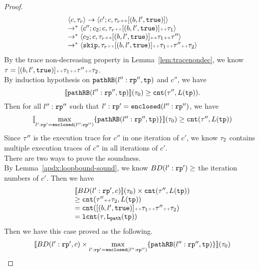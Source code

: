 \begin{proof}
\[
  \begin{array}{l}
  \langle c, \mathtt{\tau}_r \rangle \to \langle c';c, \mathtt{\tau}_r {\scriptscriptstyle ++} [(b, l', \mathtt{true})] \rangle \\
  \to^* \langle c'';c_2;c, \mathtt{\tau}_r {\scriptscriptstyle ++} [(b, l', \mathtt{true})] {\scriptscriptstyle ++} \mathtt{\tau}_1 \rangle \\
  \to^* \langle c_2;c, \mathtt{\tau}_r {\scriptscriptstyle ++} [(b, l', \mathtt{true})] {\scriptscriptstyle ++} \mathtt{\tau}_1 {\scriptscriptstyle ++} \mathtt{\tau}'' \rangle \\
  \to^* \langle \mathtt{skip}, \mathtt{\tau}_r {\scriptscriptstyle ++} [(b, l', \mathtt{true})] {\scriptscriptstyle ++} \mathtt{\tau}_1 {\scriptscriptstyle ++} \mathtt{\tau}'' {\scriptscriptstyle ++} \mathtt{\tau}_2 \rangle
  \end{array}
\]
By the trace non-decreasing property in Lemma~\ref{lem:tracenondec},
we know $\mathtt{\tau} = [(b, l', \mathtt{true})] {\scriptscriptstyle ++} \mathtt{\tau}_1 {\scriptscriptstyle ++} \mathtt{\tau}'' {\scriptscriptstyle ++} \mathtt{\tau}_2$.
\\
By induction hypothesis on $\mathtt{pathRB}(l'':\mathtt{rp}'', \mathtt{tp})$ and $c''$, we have
\[
  \llbracket \mathtt{pathRB}(l'':\mathtt{rp}'', \mathtt{tp}) \rrbracket(\mathtt{\tau}_0) 
  \geq \mathtt{cnt}(\mathtt{\tau}'', L(\mathtt{tp})).
\]
Then for all $l'':\mathtt{rp}''$ such that $l': \mathtt{rp}' = \mathtt{enclosed}(l'':\mathtt{rp}'')$, we have 
\[
  \begin{array}{l}
  \llbracket \max\limits_{l': \mathtt{rp}' = \mathtt{enclosed}(l'':\mathtt{rp}'')} \{\mathtt{pathRB}(l'':\mathtt{rp}'', \mathtt{tp})\} \rrbracket
  (\mathtt{\tau}_0)
  \geq \mathtt{cnt}(\mathtt{\tau}'', L(\mathtt{tp}))
  \end{array}
\]
Since $\mathtt{\tau}''$ is the execution trace for $c''$ in one iteration of $c'$,
we know $\mathtt{\tau}_2$ contains multiple execution traces of  $c''$ in all iterations of $c'$.
\\
There are two ways to prove the soundness.
\\
By Lemma~\ref{apdx:loopbound-sound}, we know $BD(l':\mathtt{rp}') \geq$ the iteration numbers of $c'$. Then we have
\[
  \begin{array}{l}
  \llbracket  BD(l':\mathtt{rp}', c) \rrbracket(\mathtt{\tau}_0) \times \mathtt{cnt}(\mathtt{\tau}'', L(\mathtt{tp})) \\
  \geq \mathtt{cnt}(\mathtt{\tau}'' {\scriptscriptstyle ++} \mathtt{\tau}_2, L(\mathtt{tp})) \\
  = \mathtt{cnt}([(b, l', \mathtt{true})] {\scriptscriptstyle ++} \mathtt{\tau}_1 {\scriptscriptstyle ++} \mathtt{\tau}'' {\scriptscriptstyle ++} \mathtt{\tau}_2)\\
  = \mathtt{lcnt}(\mathtt{\tau}, \mathtt{L}_{\mathtt{path}}(\mathtt{tp}))
  \end{array}
\]
Then we have this case proved as the following.
\[
  \begin{array}{l}
  \llbracket  BD(l':\mathtt{rp}', c) \times \max\limits_{l': \mathtt{rp}' = \mathtt{enclosed}(l'':\mathtt{rp}'')} \{\mathtt{pathRB}(l'':\mathtt{rp}'', \mathtt{tp})\} \rrbracket(\mathtt{\tau}_0)\\

\end{array}\]
\end{proof}
